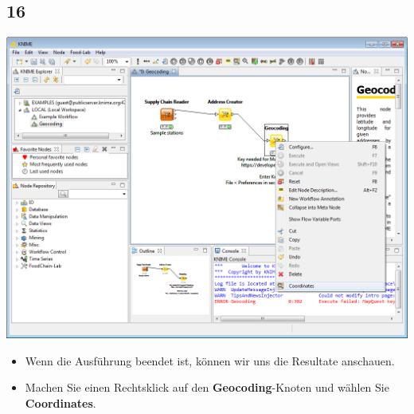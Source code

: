 \documentclass{beamer}
\begin{document}
\subsection{16}
\begin{frame}
	\begin{center}
  		\includegraphics[height=0.6\textheight]{16.png}
	\end{center}
	\begin{itemize}
		\item Wenn die Ausführung beendet ist, können wir uns die Resultate anschauen.
		\item Machen Sie einen Rechtsklick auf den \textbf{Geocoding}-Knoten und wählen Sie \textbf{Coordinates}.
	\end{itemize}
\end{frame}
\end{document}
